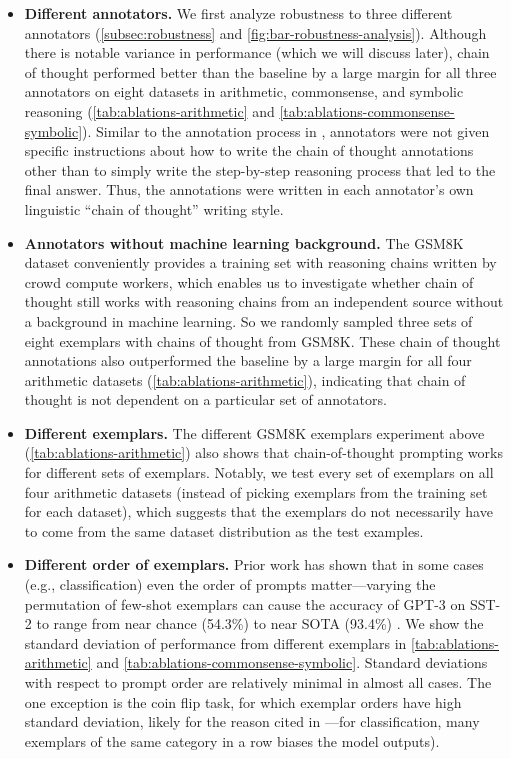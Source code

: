 \documentclass[]{article}
\theoremstyle{plain}
\theoremstyle{definition}
\theoremstyle{remark}
\newcommand{\orange}[1]{#1}
\begin{document}
\begin{itemize}[leftmargin=*]
    \item \textbf{Different annotators.} We first analyze robustness to three different annotators (\cref{subsec:robustness} and \cref{fig:bar-robustness-analysis}). Although there is notable variance in performance (which we will discuss later), chain of thought performed better than the baseline by a large margin for all three annotators on eight datasets in arithmetic, commonsense, and symbolic reasoning (\cref{tab:ablations-arithmetic} and \cref{tab:ablations-commonsense-symbolic}). \orange{Similar to the annotation process in \citet{cobbe2021training}, annotators were not given specific instructions about how to write the chain of thought annotations other than to simply write the step-by-step reasoning process that led to the final answer. Thus, the annotations were written in each annotator's own linguistic ``chain of thought'' writing style.}
    \item \textbf{Annotators without machine learning background.} The GSM8K dataset \citep{cobbe2021training} conveniently provides a training set with reasoning chains written by crowd compute workers, which enables us to investigate whether chain of thought still works with reasoning chains from an independent source without a background in machine learning. So we randomly sampled three sets of eight exemplars with chains of thought from GSM8K. These chain of thought annotations also outperformed the baseline by a large margin for all four arithmetic datasets (\cref{tab:ablations-arithmetic}), indicating that chain of thought is not dependent on a particular set of annotators.
    \item \textbf{Different exemplars.} The different GSM8K exemplars experiment above (\cref{tab:ablations-arithmetic}) also shows that chain-of-thought prompting works for different sets of exemplars. Notably, we test every set of exemplars on all four arithmetic datasets (instead of picking exemplars from the training set for each dataset), which suggests that the exemplars do not necessarily have to come from the same dataset distribution as the test examples.
    \item \textbf{Different order of exemplars.} Prior work has shown that in some cases (e.g., classification) even the order of prompts matter---varying the permutation of few-shot exemplars can cause the accuracy of GPT-3 on SST-2 to range from near chance (54.3\%) to near SOTA (93.4\%) \citep{zhao2021calibrate}. We show the standard deviation of performance from different exemplars in \cref{tab:ablations-arithmetic} and \cref{tab:ablations-commonsense-symbolic}. Standard deviations with respect to prompt order are relatively minimal in almost all cases. The one exception is the coin flip task, for which exemplar orders have high standard deviation, likely for the reason cited in \citet{zhao2021calibrate}---for classification, many exemplars of the same category in a row biases the model outputs).

\end{itemize}
\end{document}
